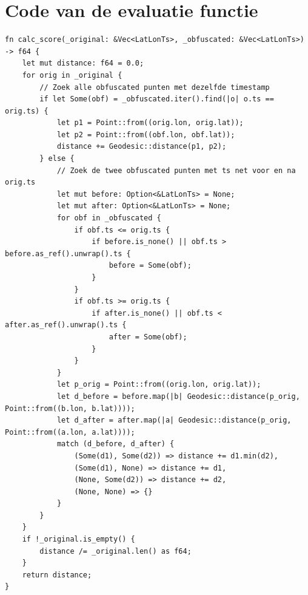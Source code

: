 \chapter{Code van de evaluatie functie}\label{code:evaluatie}
\begin{verbatim}
fn calc_score(_original: &Vec<LatLonTs>, _obfuscated: &Vec<LatLonTs>) -> f64 {
    let mut distance: f64 = 0.0;
    for orig in _original {
        // Zoek alle obfuscated punten met dezelfde timestamp
        if let Some(obf) = _obfuscated.iter().find(|o| o.ts == orig.ts) {
            let p1 = Point::from((orig.lon, orig.lat));
            let p2 = Point::from((obf.lon, obf.lat));
            distance += Geodesic::distance(p1, p2);
        } else {
            // Zoek de twee obfuscated punten met ts net voor en na orig.ts
            let mut before: Option<&LatLonTs> = None;
            let mut after: Option<&LatLonTs> = None;
            for obf in _obfuscated {
                if obf.ts <= orig.ts {
                    if before.is_none() || obf.ts > before.as_ref().unwrap().ts {
                        before = Some(obf);
                    }
                }
                if obf.ts >= orig.ts {
                    if after.is_none() || obf.ts < after.as_ref().unwrap().ts {
                        after = Some(obf);
                    }
                }
            }
            let p_orig = Point::from((orig.lon, orig.lat));
            let d_before = before.map(|b| Geodesic::distance(p_orig, Point::from((b.lon, b.lat))));
            let d_after = after.map(|a| Geodesic::distance(p_orig, Point::from((a.lon, a.lat))));
            match (d_before, d_after) {
                (Some(d1), Some(d2)) => distance += d1.min(d2),
                (Some(d1), None) => distance += d1,
                (None, Some(d2)) => distance += d2,
                (None, None) => {}
            }
        }
    }
    if !_original.is_empty() {
        distance /= _original.len() as f64;
    }
    return distance;
}
\end{verbatim}